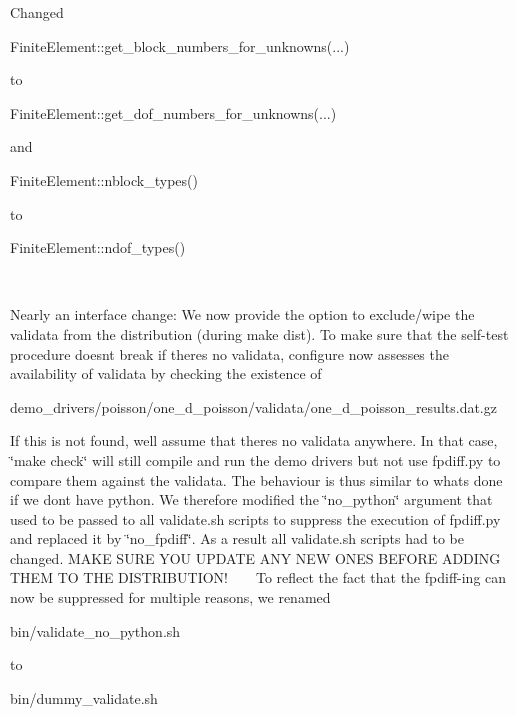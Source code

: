 \begin{DoxyItemize}
\item Changed 
\begin{DoxyCode}
FiniteElement::get\_block\_numbers\_for\_unknowns(...)
\end{DoxyCode}
 to 
\begin{DoxyCode}
FiniteElement::get\_dof\_numbers\_for\_unknowns(...)
\end{DoxyCode}
 and 
\begin{DoxyCode}
FiniteElement::nblock\_types()
\end{DoxyCode}
 to 
\begin{DoxyCode}
FiniteElement::ndof\_types()
\end{DoxyCode}
 ~\newline
~\newline

\item Nearly an interface change\+: We now provide the option to exclude/wipe the validata from the distribution (during {\ttfamily make} {\ttfamily dist}). To make sure that the self-\/test procedure doesn\textquotesingle{}t break if there\textquotesingle{}s no validata, configure now assesses the availability of validata by checking the existence of 
\begin{DoxyCode}
demo\_drivers/poisson/one\_d\_poisson/validata/one\_d\_poisson\_results.dat.gz
\end{DoxyCode}
 If this is not found, we\textquotesingle{}ll assume that there\textquotesingle{}s no validata anywhere. In that case, \char`\"{}make check\char`\"{} will still compile and run the demo drivers but not use fpdiff.\+py to compare them against the validata. The behaviour is thus similar to what\textquotesingle{}s done if we don\textquotesingle{}t have python. We therefore modified the \char`\"{}no\+\_\+python\char`\"{} argument that used to be passed to all validate.\+sh scripts to suppress the execution of fpdiff.\+py and replaced it by \char`\"{}no\+\_\+fpdiff\char`\"{}. As a result all validate.\+sh scripts had to be changed. M\+A\+KE S\+U\+RE Y\+OU U\+P\+D\+A\+TE A\+NY N\+EW O\+N\+ES B\+E\+F\+O\+RE A\+D\+D\+I\+NG T\+H\+EM TO T\+HE D\+I\+S\+T\+R\+I\+B\+U\+T\+I\+O\+N! ~\newline
~\newline
 To reflect the fact that the fpdiff-\/ing can now be suppressed for multiple reasons, we renamed 
\begin{DoxyCode}
bin/validate\_no\_python.sh
\end{DoxyCode}
 to 
\begin{DoxyCode}
bin/dummy\_validate.sh
\end{DoxyCode}
 ~\newline
~\newline


\end{DoxyItemize}

